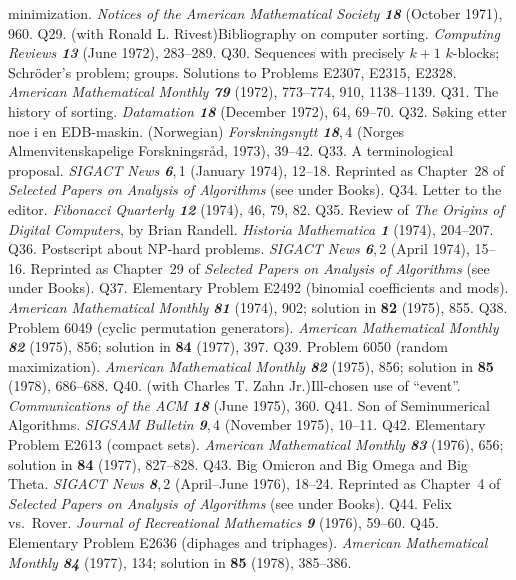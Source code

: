  minimization.  {\sl Notices of the American Mathematical Society\/
 \bf 18} (October 1971), 960.  
\p Q29.  (with Ronald L. Rivest)\xskip Bibliography on computer sorting. 
 {\sl Computing Reviews\/ \bf 13} (June 1972), 283--289.
\p Q30.  Sequences with precisely $k+1$ $k$-blocks; Schr\"oder's problem;
 groups.  Solutions to Problems E2307, E2315, E2328.
 {\sl American Mathematical Monthly\/ \bf 79} (1972), 773--774,
 910, 1138--1139.
\p Q31.  The history of sorting.  {\sl Datamation\/ \bf 18} (December 1972),
 64, 69--70.  
\p Q32.  S\o king etter noe i en EDB-maskin.  (Norwegian)
 {\sl Forskningsnytt\/ \bf 18},\,4 (Norges Almenvitenskapelige
 Forskningsr{\aa}d, 1973), 39--42.  
\p Q33.  A terminological proposal.  {\sl SIGACT News\/ \bf 6},\,1
 (January 1974), 12--18.  
 Reprinted as Chapter~28 of {\sl Selected Papers on Analysis of Algorithms\/}
 (see under Books).
\p Q34. Letter to the editor. {\sl Fibonacci Quarterly\/ \bf12} (1974),
 46, 79, 82.
\p Q35.  Review of {\sl The Origins of Digital Computers}, by Brian Randell.
 {\sl Historia Mathematica\/ \bf 1} (1974), 204--207.
\p Q36.  Postscript about NP-hard problems.  {\sl SIGACT News\/ \bf 6},\,2
 (April 1974), 15--16.  
 Reprinted as Chapter~29 of {\sl Selected Papers on Analysis of Algorithms\/}
 (see under Books).
\p Q37. Elementary Problem E2492 (binomial coefficients and mods).
 {\sl American Mathematical Monthly\/ \bf 81} (1974), 902;
 solution in {\bf 82} (1975), 855.
\p Q38. Problem 6049 (cyclic permutation generators).
 {\sl American Mathematical Monthly\/ \bf 82} (1975), 856;
 solution in {\bf 84} (1977), 397.
\p Q39. Problem 6050 (random maximization).
 {\sl American Mathematical Monthly\/ \bf 82} (1975), 856;
 solution in {\bf 85} (1978), 686--688.
\p Q40.  (with Charles T. Zahn Jr.)\xskip  Ill-chosen use of
 ``event''.  {\sl Commun\-i\-ca\-tions of the ACM\/ \bf 18} (June 1975), 360.  
\p Q41. Son of Seminumerical Algorithms.  {\sl SIGSAM Bulletin\/ \bf 9},\,4
 (November 1975), 10--11.  
\p Q42. Elementary Problem E2613 (compact sets).
 {\sl American Mathematical Monthly\/ \bf 83} (1976), 656;
 solution in {\bf 84} (1977), 827--828.
\p Q43.  Big Omicron and Big Omega and Big Theta.  {\sl SIGACT News\/
 \bf 8},\,2 (April--June 1976), 18--24.  
 Reprinted as Chapter~4 of {\sl Selected Papers on Analysis of Algorithms\/}
 (see under Books).
\p Q44.  Felix vs.\ Rover.  {\sl Journal of Recreational Mathematics\/
 \bf 9} (1976), 59--60.  
\p Q45. Elementary Problem E2636 (diphages and triphages).
 {\sl American Mathematical Monthly\/ \bf 84} (1977), 134;
 solution in {\bf 85} (1978), 385--386.
